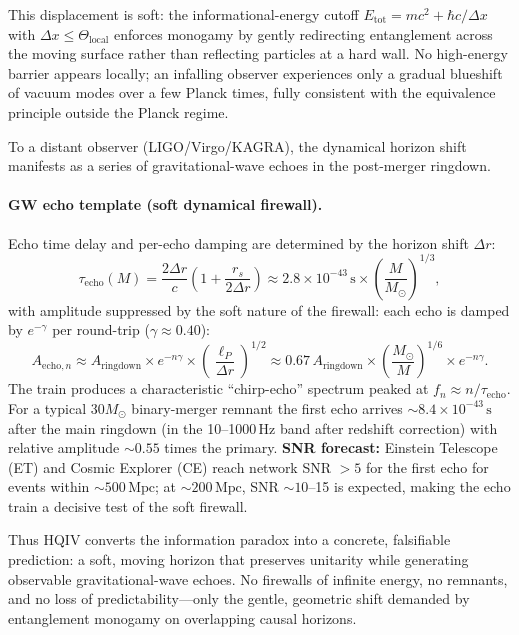 \documentclass[12pt,a4paper]{article}
\begin{document}
This displacement is soft: the informational-energy cutoff \(E_\mathrm{tot} = mc^2 + \hbar c/\Delta x\) with \(\Delta x\le\Theta_\mathrm{local}\) enforces monogamy by gently redirecting entanglement across the moving surface rather than reflecting particles at a hard wall. No high-energy barrier appears locally; an infalling observer experiences only a gradual blueshift of vacuum modes over a few Planck times, fully consistent with the equivalence principle outside the Planck regime.

To a distant observer (LIGO/Virgo/KAGRA), the dynamical horizon shift manifests as a series of gravitational-wave echoes in the post-merger ringdown.

\paragraph{GW echo template (soft dynamical firewall).}
Echo time delay and per-echo damping are determined by the horizon shift \(\Delta r\):
\[
\tau_\mathrm{echo}(M) = \frac{2\Delta r}{c} \left(1 + \frac{r_s}{2\Delta r}\right) \approx 2.8 \times 10^{-43}\,\mathrm{s} \times \left(\frac{M}{M_\odot}\right)^{1/3},
\]
with amplitude suppressed by the soft nature of the firewall: each echo is damped by \(e^{-\gamma}\) per round-trip (\(\gamma \approx 0.40\)):
\[
A_{\mathrm{echo},n} \approx A_\mathrm{ringdown} \times e^{-n\gamma} \times \left(\frac{\ell_P}{\Delta r}\right)^{1/2} \approx 0.67\,A_\mathrm{ringdown} \times \left(\frac{M_\odot}{M}\right)^{1/6} \times e^{-n\gamma}.
\]
The train produces a characteristic ``chirp-echo'' spectrum peaked at \(f_n \approx n/\tau_\mathrm{echo}\). For a typical 30\(M_\odot\) binary-merger remnant the first echo arrives \(\sim 8.4 \times 10^{-43}\,\mathrm{s}\) after the main ringdown (in the 10--1000\,Hz band after redshift correction) with relative amplitude \(\sim 0.55\) times the primary. \textbf{SNR forecast:} Einstein Telescope (ET) and Cosmic Explorer (CE) reach network SNR \(> 5\) for the first echo for events within \(\sim 500\,\mathrm{Mpc}\); at \(\sim 200\,\mathrm{Mpc}\), SNR \(\sim 10\)--15 is expected, making the echo train a decisive test of the soft firewall.

Thus HQIV converts the information paradox into a concrete, falsifiable prediction: a soft, moving horizon that preserves unitarity while generating observable gravitational-wave echoes. No firewalls of infinite energy, no remnants, and no loss of predictability—only the gentle, geometric shift demanded by entanglement monogamy on overlapping causal horizons.
\end{document}

